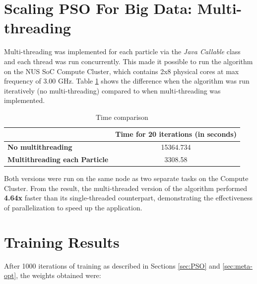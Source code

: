 \documentclass[12pt]{article}
\numberwithin{table}{section}
\numberwithin{figure}{section}
\begin{document}
\section{Scaling PSO For Big Data: Multi-threading}
Multi-threading was implemented for each particle via the \emph{Java Callable} class and each thread was run concurrently. This made it possible to run the algorithm on the NUS SoC Compute Cluster, which contains 2x8 physical cores at max frequency of 3.00 GHz. Table \ref{tab:parallel-comparison} shows the difference when the algorithm was run iteratively (no multi-threading) compared to when multi-threading was implemented.

\begin{table}[H]
\small
\centering
\caption{Time comparison}
\label{tab:parallel-comparison}
\begin{tabular}{|l|c|}
\hline
                                      & \textbf{Time for 20 iterations (in seconds)} \\ \hline
\textbf{No multithreading}            & 15364.734                                              \\ \hline
\textbf{Multithreading each Particle} & 3308.58\\ \hline
\end{tabular}
\end{table}
Both versions were run on the same node as two separate tasks on the Compute Cluster. From the result, the multi-threaded version of the algorithm performed \textbf{4.64x} faster than its single-threaded counterpart, demonstrating the effectiveness of parallelization to speed up the application.

\section{Training Results}\label{sec:weights}
After 1000 iterations of training as described in Sections \ref{sec:PSO} and \ref{sec:meta-opt}, the weights obtained were:

\end{document}
